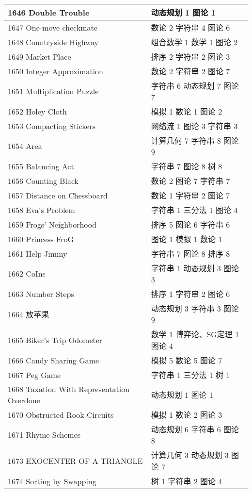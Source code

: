 \begin{longtable}{| p{} | p{} |}
 1646 Double Trouble  & 动态规划 1 图论 1 \\ \hline
 1647 One-move checkmate  & 数论 2 字符串 4 图论 6 \\ \hline
 1648 Countryside Highway  & 组合数学 1 数学 1 图论 2 \\ \hline
 1649 Market Place  & 排序 2 字符串 2 图论 3 \\ \hline
 1650 Integer Approximation  & 数论 2 字符串 2 图论 7 \\ \hline
 1651 Multiplication Puzzle  & 字符串 6 动态规划 7 图论 7 \\ \hline
 1652 Holey Cloth  & 模拟 1 数论 1 图论 2 \\ \hline
 1653 Compacting Stickers  & 网络流 1 图论 3 字符串 3 \\ \hline
 1654 Area  & 计算几何 7 字符串 8 图论 9 \\ \hline
 1655 Balancing Act  & 字符串 7 图论 8 树 8 \\ \hline
 1656 Counting Black  & 数论 2 图论 7 字符串 7 \\ \hline
 1657 Distance on Chessboard  & 数论 1 字符串 2 图论 7 \\ \hline
 1658 Eva's Problem  & 字符串 1 三分法 1 图论 4 \\ \hline
 1659 Frogs' Neighborhood  & 排序 5 图论 6 字符串 6 \\ \hline
 1660 Princess FroG  & 图论 1 模拟 1 数论 1 \\ \hline
 1661 Help Jimmy  & 字符串 7 图论 8 排序 8 \\ \hline
 1662 CoIns  & 字符串 1 动态规划 3 图论 3 \\ \hline
 1663 Number Steps  & 排序 1 字符串 2 图论 6 \\ \hline
 1664 放苹果  & 动态规划 3 字符串 3 图论 9 \\ \hline
 1665 Biker's Trip Odometer  & 数学 1 博弈论、SG定理 1 图论 4 \\ \hline
 1666 Candy Sharing Game  & 模拟 5 数论 5 图论 7 \\ \hline
 1667 Peg Game  & 字符串 1 三分法 1 树 1 \\ \hline
 1668 Taxation With Representation Overdone  & 动态规划 1 图论 1 \\ \hline
 1670 Obstructed Rook Circuits  & 模拟 1 数论 2 图论 3 \\ \hline
 1671 Rhyme Schemes  & 动态规划 6 字符串 6 图论 8 \\ \hline
 1673 EXOCENTER OF A TRIANGLE  & 计算几何 3 动态规划 3 图论 7 \\ \hline
 1674 Sorting by Swapping  & 树 1 字符串 2 图论 4 \\ \hline

\end{longtable}
